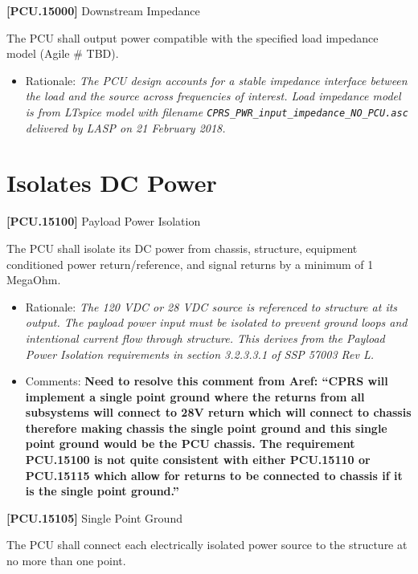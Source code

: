 \textbf{[PCU.15000]} Downstream Impedance

The \gls{PCU} shall output power compatible with the specified load impedance model (Agile \# TBD\label{tbx_10}).

\begin{itemize}
\item{} Rationale: \emph{The PCU design accounts for a stable impedance interface between the load and the source across frequencies of interest. Load impedance model is from LTspice model with filename \texttt{CPRS\_PWR\_input\_impedance\_NO\_PCU.asc} delivered by LASP on 21 February 2018.}

\end{itemize}

\section{Isolates DC Power}
\label{isolatesdcpower}

\textbf{[PCU.15100]} Payload Power Isolation

The \gls{PCU} shall isolate its DC power from chassis, structure, equipment conditioned power return\slash reference, and signal returns by a minimum of 1 MegaOhm.

\begin{itemize}
\item{} Rationale: \emph{The 120 VDC or 28 VDC source is referenced to structure at its output. The payload power input must be isolated to prevent ground loops and intentional current flow through structure. This derives from the Payload Power Isolation requirements in section 3.2.3.3.1 of SSP 57003 Rev L.}

\item{} Comments: \textbf{Need to resolve this comment from Aref: ``CPRS will implement a single point ground where the returns from all subsystems will connect to 28V return which will connect to chassis therefore making chassis the single point ground and this single point ground would be the PCU chassis. The requirement PCU.15100 is not quite consistent with either PCU.15110 or PCU.15115 which allow for returns to be connected to chassis if it is the single point ground.''}

\end{itemize}

\textbf{[PCU.15105]} Single Point Ground

The \gls{PCU} shall connect each electrically isolated power source to the structure at no more than one point.

